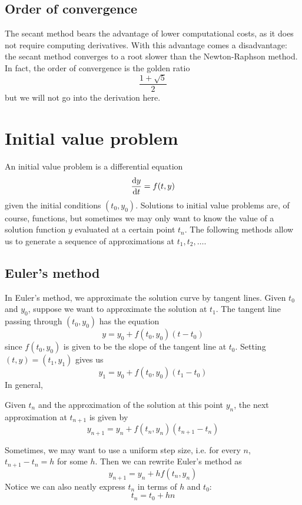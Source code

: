 \subsection{Order of convergence}
The secant method bears the advantage of lower computational costs, as it does not require computing derivatives. With this advantage comes a disadvantage: the secant method converges to a root slower than the Newton-Raphson method. In fact, the order of convergence is the golden ratio
\[
  \frac{1 + \sqrt{5}}{2}
\]
but we will not go into the derivation here.


\section{Initial value problem}
An initial value problem is a differential equation
\[
  \frac{\operatorname{d\!} y}{\operatorname{d\!} t} = f(t, y)
\]
given the initial conditions $(t_0, y_0)$. Solutions to initial value problems are, of course, functions, but sometimes we may only want to know the value of a solution function $y$ evaluated at a certain point $t_n$. The following methods allow us to generate a sequence of approximations at $t_1, t_2, \ldots$.


\subsection{Euler's method}
In Euler's method, we approximate the solution curve by tangent lines. Given $t_0$ and $y_0$, suppose we want to approximate the solution at $t_1$. The tangent line passing through $(t_0, y_0)$ has the equation
\[
  y = y_0 + f(t_0, y_0) (t - t_0)
\]
since $f(t_0, y_0)$ is given to be the slope of the tangent line at $t_0$. Setting $(t, y) = (t_1, y_1)$ gives us
\[
  y_1 = y_0 + f(t_0, y_0) (t_1 - t_0)
\]
In general,
\begin{definition}
  Given $t_n$ and the approximation of the solution at this point $y_n$, the next approximation at $t_{n + 1}$ is given by
  \[
    y_{n + 1} = y_n + f(t_n, y_n) (t_{n + 1} - t_n)
  \]
\end{definition}
Sometimes, we may want to use a uniform step size, i.e. for every $n$, $t_{n + 1} - t_n = h$ for some $h$. Then we can rewrite Euler's method as
\[
  y_{n + 1} = y_n + hf(t_n, y_n)
\]
Notice we can also neatly express $t_n$ in terms of $h$ and $t_0$:
\[
  t_n = t_0 + hn
\]

